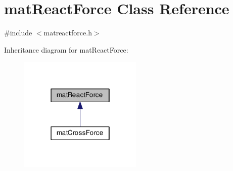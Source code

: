 \hypertarget{classmat_react_force}{\section{mat\-React\-Force Class Reference}
\label{classmat_react_force}
}


{\ttfamily \#include $<$matreactforce.\-h$>$}



Inheritance diagram for mat\-React\-Force\-:\nopagebreak
\begin{figure}[H]
\begin{center}
\leavevmode
\includegraphics[width=166pt]{classmat_react_force__inherit__graph}
\end{center}
\end{figure}
